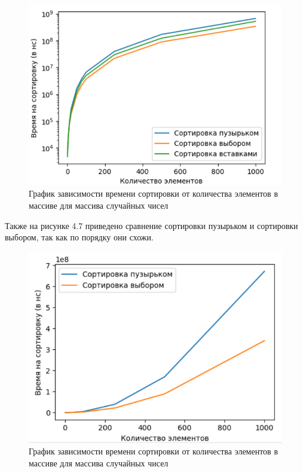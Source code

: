 \FloatBarrier
\begin{figure}[ht]
	\begin{center}
		\includegraphics{inc/random5.png}
	\end{center}
	\caption{График зависимости времени сортировки от количества элементов в массиве для массива случайных чисел}
\end{figure}
\FloatBarrier

Также на рисунке 4.7 приведено сравнение сортировки пузырьком и сортировки выбором, так как 
по порядку они схожи.

\FloatBarrier
\begin{figure}[ht]
	\begin{center}
		\includegraphics{inc/random6.png}
	\end{center}
	\caption{График зависимости времени сортировки от количества элементов в массиве для массива случайных чисел}
\end{figure}
\FloatBarrier

